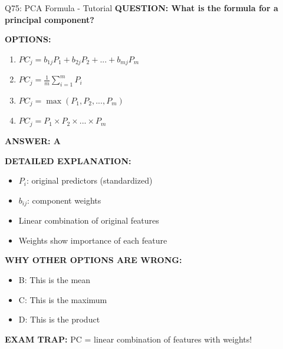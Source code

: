 \documentclass[8pt]{beamer}
\begin{document}
	\begin{frame}{Q75: PCA Formula - Tutorial}
		\fontsize{6.5}{7.5}\selectfont
		\textbf{QUESTION: What is the formula for a principal component?}
		
		\vspace{0.1cm}
		\textbf{OPTIONS:}
		\begin{enumerate}
			\item $PC_j = b_{1j}P_1 + b_{2j}P_2 + ... + b_{mj}P_m$
			\item $PC_j = \frac{1}{m}\sum_{i=1}^m P_i$
			\item $PC_j = \max(P_1, P_2, ..., P_m)$
			\item $PC_j = P_1 \times P_2 \times ... \times P_m$
		\end{enumerate}
		
		\vspace{0.1cm}
		\textcolor{myblue}{\textbf{ANSWER: A}}
		
		\vspace{0.1cm}
		\textbf{DETAILED EXPLANATION:}
		\begin{itemize}
			\item $P_i$: original predictors (standardized)
			\item $b_{ij}$: component weights
			\item Linear combination of original features
			\item Weights show importance of each feature
		\end{itemize}
		
		\vspace{0.1cm}
		\textcolor{myred}{\textbf{WHY OTHER OPTIONS ARE WRONG:}}
		\begin{itemize}
			\item \textcolor{myred}{B:} This is the mean
			\item \textcolor{myred}{C:} This is the maximum
			\item \textcolor{myred}{D:} This is the product
		\end{itemize}
		
		\textcolor{myred}{\textbf{EXAM TRAP:}} PC = \textcolor{myblue}{linear combination of features with weights}!
	\end{frame}
	
\end{document}

